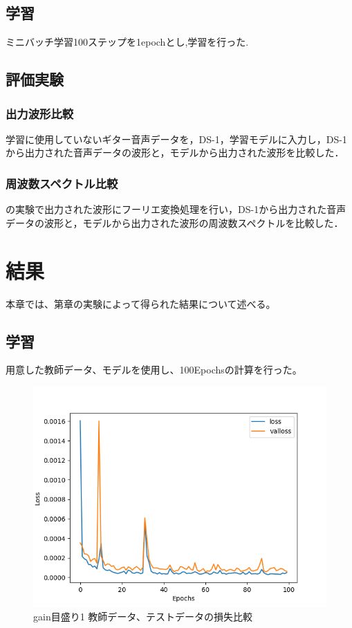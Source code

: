 \documentclass{jreport}		%
\begin{document}
\section{学習}
ミニバッチ学習100ステップを1epochとし,学習を行った.

\section{評価実験}
\subsection{出力波形比較}
学習に使用していないギター音声データを，DS-1，学習モデルに入力し，DS-1から出力された音声データの波形と，モデルから出力された波形を比較した．

\subsection{周波数スペクトル比較}
の実験で出力された波形にフーリエ変換処理を行い，DS-1から出力された音声データの波形と，モデルから出力された波形の周波数スペクトルを比較した．

\chapter{結果}
本章では、第章の実験によって得られた結果について述べる。

\section{学習}
用意した教師データ、モデルを使用し、100Epochsの計算を行った。
\begin{figure}[htbp]
 \begin{center}
  \includegraphics[width=150mm]{gain1_loss_hikaku.png}
 \end{center}
 \caption{gain目盛り1 教師データ、テストデータの損失比較}
 \label{fig:one}
\end{figure}
\end{document}

